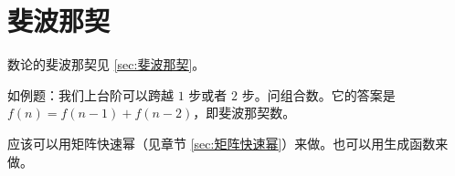 \section{斐波那契}
\label{sec:组合数学斐波那契}

数论的斐波那契见 \ref{sec:斐波那契}。

如例题：我们上台阶可以跨越 $1$ 步或者 $2$ 步。问组合数。它的答案是 $f(n) = f(n -
1) + f(n - 2)$，即斐波那契数。

应该可以用矩阵快速幂（见章节 \ref{sec:矩阵快速幂}）来做。也可以用生成函数来做。
